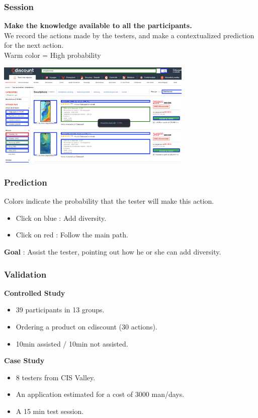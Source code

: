 \documentclass{beamer}
\begin{document}



\begin{frame}
    \frametitle{Session}
    \textbf{Make the knowledge available to all the participants.} \\
    We record the actions made by the testers, and make a contextualized prediction for the next action. \\
    Warm color = High probability
    \vspace{1em}

    \includegraphics[width=0.7\textwidth]{img/plugin.png}
\end{frame}

\begin{frame}
    \frametitle{Prediction}
    Colors indicate the probability that the tester will make this action.  \\
    \begin{itemize}
        \item Click on blue : Add diversity.
        \item Click on red  : Follow the main path.
    \end{itemize}
    
    \textbf{Goal} : Assist the tester, pointing out how he or she can add diversity.
\end{frame}

\begin{frame}
    \frametitle{Validation}
    \textbf{Controlled Study}\\
    \begin{itemize}
        \item 39 participants in 13 groups.
        \item Ordering a product on cdiscount (30 actions).
        \item 10min assisted / 10min not assisted.
    \end{itemize}

    \textbf{Case Study}\\
    \begin{itemize}
        \item 8 testers from CIS Valley.
        \item An application estimated for a cost of 3000 man/days.
        \item A 15 min test session.
    \end{itemize}
\end{frame}
\end{document}
